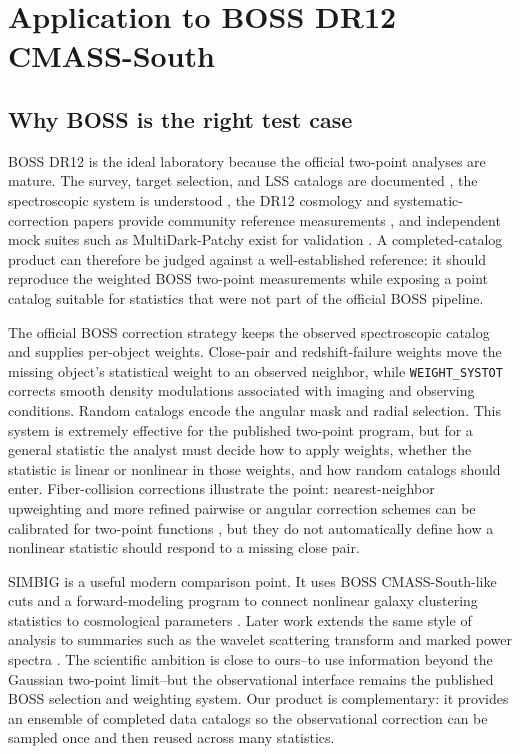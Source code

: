 \documentclass[apj]{emulateapj}
\begin{document}
\section{Application to BOSS DR12 CMASS-South}
\label{sec:application}

\subsection{Why BOSS is the right test case}
\label{subsec:boss_context}

BOSS DR12 is the ideal laboratory because the official two-point analyses are
mature.  The survey, target selection, and LSS catalogs are documented
\citep{Dawson2013,Reid2016}, the spectroscopic system is understood
\citep{Smee2013}, the DR12 cosmology and systematic-correction papers provide
community reference measurements \citep{Alam2017,Ross2017}, and independent
mock suites such as MultiDark-Patchy exist for validation
\citep{Kitaura2016}.  A completed-catalog product can therefore be judged
against a well-established reference: it should reproduce the weighted BOSS
two-point measurements while exposing a point catalog suitable for statistics
that were not part of the official BOSS pipeline.

The official BOSS correction strategy keeps the observed spectroscopic catalog
and supplies per-object weights.  Close-pair and redshift-failure weights move
the missing object's statistical weight to an observed neighbor, while
\texttt{WEIGHT\_SYSTOT} corrects smooth density modulations associated with
imaging and observing conditions.  Random catalogs encode the angular mask and
radial selection.  This system is extremely effective for the published
two-point program, but for a general statistic the analyst must decide how to
apply weights, whether the statistic is linear or nonlinear in those weights,
and how random catalogs should enter.
Fiber-collision corrections illustrate the point: nearest-neighbor upweighting
and more refined pairwise or angular correction schemes can be calibrated for
two-point functions \citep{Guo2012,Mohammad2020}, but they do not automatically
define how a nonlinear statistic should respond to a missing close pair.

SIMBIG is a useful modern comparison point.  It uses BOSS CMASS-South-like cuts
and a forward-modeling program to connect nonlinear galaxy clustering
statistics to cosmological parameters \citep{Hahn2023Mock,Hahn2023PNAS,
Hahn2024NatAs,Hahn2024Bispectrum}.  Later work extends the same style of
analysis to summaries such as the wavelet scattering transform and marked power
spectra \citep{Regaldo2024,Massara2025SBI}.  The scientific ambition is close
to ours--to use information beyond the Gaussian two-point limit--but the
observational interface remains the published BOSS selection and weighting
system.  Our product is complementary: it provides an ensemble of completed
data catalogs so the observational correction can be sampled once and then
reused across many statistics.
\end{document}
